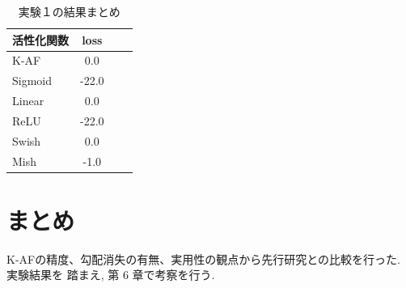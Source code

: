\begin{table}[htbp]
    \begin{center}
        \caption{実験１の結果まとめ}
        \begin{tabular}{l*{2}{c}r}
            活性化関数              & loss \\
            \hline
            K-AF            & 0.0 \\
            Sigmoid            & -22.0 \\
            Linear            & 0.0 \\
            ReLU        & -22.0 \\
            Swish           & 0.0 \\
            Mish           & -1.0 \\
    
        \end{tabular}
    \end{center}
\end{table}




\section{まとめ}

K-AFの精度、勾配消失の有無、実用性の観点から先行研究との比較を行った. 実験結果を
踏まえ, 第 6 章で考察を行う.


